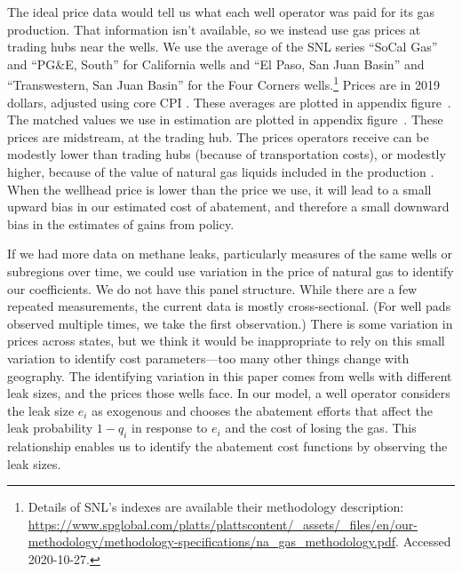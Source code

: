 The ideal price data would tell us what each well operator was paid for its gas production.
That information isn't available, so we instead use gas prices at trading hubs near the wells.
We use the average of the \gls{SNL} series ``SoCal Gas'' and ``PG\&E, South'' for California wells and
``El Paso, San Juan Basin'' and ``Transwestern, San Juan Basin'' for the Four Corners wells.\footnote{%
Details of SNL's indexes are available their methodology description:\hspace{0em plus 2em} \url{https://www.spglobal.com/platts/plattscontent/_assets/_files/en/our-methodology/methodology-specifications/na_gas_methodology.pdf}.
Accessed 2020-10-27.}
Prices are in 2019 dollars, adjusted using core CPI \parencite{fred_cpi}.
These averages are plotted in appendix figure~\iftoggle{usexr}{\ref{fig:nat-gas-price-timeseries}}{A7}.
The matched values we use in estimation are plotted in appendix figure~\iftoggle{usexr}{\ref{fig:nat-gas-price-histogram}}{A8}.
These prices are midstream, at the trading hub.
The  prices operators receive can be modestly lower than trading hubs (because of transportation costs), or modestly higher, because of the value of natural gas liquids included in the production
\parencite{Agerton/Gilbert/Upton:2023}.
When the wellhead price is lower than the price we use, it will lead to a small upward bias in our estimated cost of abatement, and therefore a small downward bias in the estimates of gains from policy.


If we had more data on methane leaks, particularly measures of the same wells or subregions over time, we could use variation in the price of natural gas to identify our coefficients.
We do not have this panel structure.
While there are a few repeated measurements, the current data is mostly cross-sectional.
(For well pads observed multiple times, we take the first observation.)
There is some variation in prices across states, but we think it would be inappropriate to rely on this small variation to identify cost parameters---too many other things change with geography.
The identifying variation in this paper comes from wells with different leak sizes, and the prices those wells face.
In our model, a well operator considers the leak size \(e_i\) as exogenous and chooses the abatement efforts that affect the leak probability \(1 - q_i\) in response to \(e_i\) and the cost of losing the gas.
This relationship enables us to identify the abatement cost functions by observing the leak sizes.



